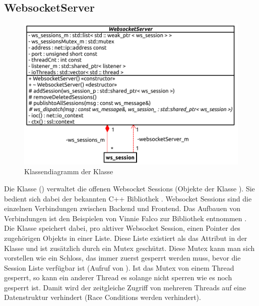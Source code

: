 \subsection{WebsocketServer}
\begin{figure}[ht]
  \centering
  \includegraphics[width=\textwidth]{content/hauptteil/umsetzungPoC/backend/uml/classesOfOverview/WebsocketServer.pdf}
  \caption{Klassendiagramm der Klasse }
  \label{fig:backend:classDiag:WebsocketServer}
\end{figure}
Die Klasse  () verwaltet die offenen Websocket Sessions (Objekte der Klasse ).
Sie bedient sich dabei der bekannten  C++ Bibliothek  \citep{beast:lib}.
Websocket Sessions sind die einzelnen Verbindungen zwischen Backend und Frontend.
Das Aufbauen von Verbindungen ist den Beispielen von Vinnie Falco zur  Bibliothek entnommen \citep{beast:examples}.
Die  Klasse speichert dabei, pro aktiver Websocket Session, einen Pointer des zugehörigen  Objekts in einer Liste.
Diese Liste existiert als das Attribut  in der Klasse  und ist zusätzlich durch ein Mutex geschützt.
Diese Mutex kann man sich vorstellen wie ein Schloss, das immer zuerst gesperrt werden muss, 
bevor die Session Liste verfügbar ist (Aufruf von ). 
Ist das Mutex von einem Thread gesperrt, so kann ein anderer Thread es solange nicht sperren wie es noch gesperrt ist.
Damit wird der zeitgleiche Zugriff von mehreren Threads auf eine Datenstruktur verhindert (Race Conditions werden verhindert).
